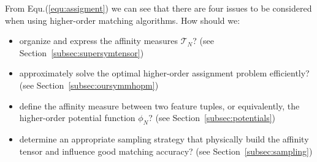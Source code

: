 From Equ.(\ref{equ:assigment}) we can see that there are four issues to be considered when using higher-order matching algorithms. How should we:
\begin{itemize}
\item organize and express the affinity measures $\mathcal{T}_N$? (see Section~\ref{subsec:supersymtensor})
\item approximately solve the optimal higher-order assignment problem efficiently? (see Section~\ref{subsec:oursymmhopm})
\item define the affinity measure between two feature tuples, or equivalently, the higher-order potential function $\phi_N$? (see Section~\ref{subsec:potentials})
\item determine an appropriate sampling strategy that physically build the affinity tensor and influence good matching accuracy? (see Section~\ref{subsec:sampling})
\end{itemize}



